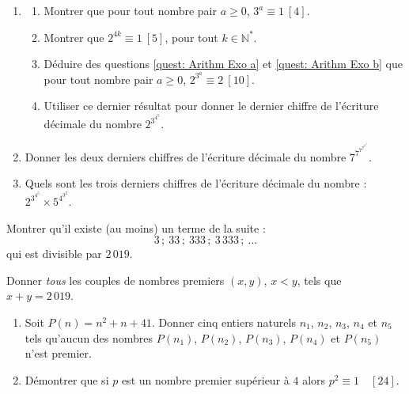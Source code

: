 \begin{exo}
	\begin{enumerate}
		\item 
			\begin{enumerate}
				\item Montrer que pour tout nombre pair $a \geq 0$, $3^a \equiv 1 \ [4]$.
					\label{quest: Arithm Exo a}
				\item Montrer que $2^{4k} \equiv 1 \ [5]$, pour tout $k \in \mathbb{N}^*$.
					\label{quest: Arithm Exo b}
				\item D\'eduire des questions \ref{quest: Arithm Exo a} et \ref{quest: Arithm Exo b} que 
					pour tout nombre pair $a \geq 0$, $2^{3^a} \equiv 2 \ [10]$.
				\item Utiliser ce dernier r\'esultat pour donner le dernier chiffre de l'\'ecriture d\'ecimale du nombre
					$2^{3^{4^5}}$.
			\end{enumerate}
		\item Donner les deux derniers chiffres de l'\'ecriture d\'ecimale du nombre $7^{7^{7^{7^{7^{7^7}}}}}$.
		\item Quels sont les trois derniers chiffres de l'\'ecriture d\'ecimale du nombre : 
			$\displaystyle 2^{3^{4^{5}}} \times 5^{4^{3^{2}}}$. \trollface
	\end{enumerate}
\end{exo}

\begin{exo}
	Montrer qu'il existe (au moins) un terme de la suite :
		\[
			3			\, ;\ 
			33			\, ;\ 
			333			\, ;\ 
			3\,333		\, ;\ 
			\ldots
		\]
		qui est divisible par $2\,019$.
\end{exo}

\begin{exo}[Ne pensez pas trop loin \trollface]
	Donner \emph{tous} les couples de nombres premiers $( x,y )$, $x < y$, tels que $x + y = 2\,019$.
\end{exo}

\begin{exo}
	\begin{enumerate}
		\item Soit $P(n) = n^2 + n + 41$.
			Donner cinq entiers naturels $n_1$, $n_2$, $n_3$, $n_4$ et $n_5$ tels 
			qu'aucun des nombres $P(n_1)$, $P(n_2)$, $P(n_3)$, $P(n_4)$ et $P(n_5)$ n'est premier.
		\item D\'emontrer que si $p$ est un nombre premier sup\'erieur \`a $4$ alors $p^2 \equiv 1 \quad [24]$.
	\end{enumerate}
\end{exo}
























